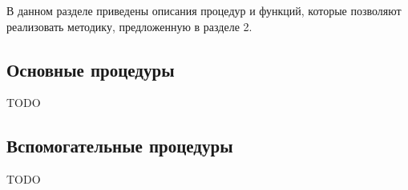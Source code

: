 \documentclass[../main.tex]{subfiles}
\begin{document}
В данном разделе приведены описания процедур и функций, которые позволяют реализовать методику, предложенную в разделе 2. 
\subsection{Основные процедуры}
TODO
\subsection{Вспомогательные процедуры}
TODO
\end{document}
